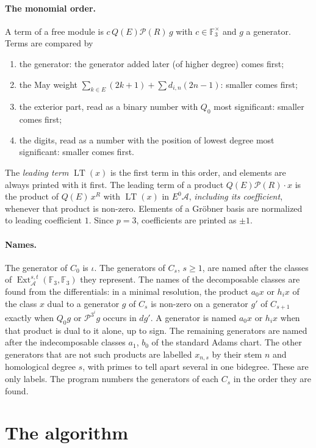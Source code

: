 \documentclass[11pt]{article}
\renewcommand{\P}{\mathcal{P}}
\newcommand{\F}{\mathbb{F}_3}
\newcommand{\A}{\mathcal{A}}
\DeclareMathOperator{\LT}{LT}
\DeclareMathOperator{\Ext}{Ext}
\begin{document}
\paragraph{The monomial order.}
A term of a free module is $c\, Q(E)\P(R)\, g$ with $c \in \F^\times$ and $g$ a generator.
Terms are compared by
\begin{enumerate}
\item the generator: the generator added later (of higher degree) comes first;
\item the May weight $\sum_{k \in E}(2k+1) + \sum d_{i,n}(2n - 1)$: smaller comes first;
\item the exterior part, read as a binary number with $Q_0$ most significant: smaller comes
  first;
\item the digits, read as a number with the position of lowest degree most significant:
  smaller comes first.
\end{enumerate}
The \emph{leading term} $\LT(x)$ is the first term in this order, and elements are always
printed with it first. The leading term of a product $Q(E)\P(R)\cdot x$ is the product of
$Q(E)\,x^R$ with $\LT(x)$ in $E^0\A$, \emph{including its coefficient}, whenever that product
is non-zero. Elements of a Gröbner basis are normalized to leading coefficient $1$. Since
$p = 3$, coefficients are printed as $\pm 1$.

\paragraph{Names.}
The generator of $C_0$ is $\iota$. The generators of $C_s$, $s \ge 1$, are named after the
classes of $\Ext_\A^{s,t}(\F, \F)$ they represent. The names of the decomposable classes are
found from the differentials: in a minimal resolution, the product $a_0 x$ or $h_i x$ of the
class $x$ dual to a generator $g$ of $C_s$ is non-zero on a generator $g'$ of $C_{s+1}$ exactly
when $Q_0 g$ or $\P^{3^i} g$ occurs in $d g'$. A generator is named $a_0 x$ or $h_i x$ when that
product is dual to it alone, up to sign. The remaining generators are named after the indecomposable classes $a_1$, $b_0$ of the standard Adams chart. The other generators that are not such products are labelled $x_{n,s}$ by their stem $n$ and homological degree $s$, with primes to tell apart several in one bidegree.
These are only labels. The program numbers the generators of each $C_s$ in the order they are
found.

\section{The algorithm}
\end{document}
